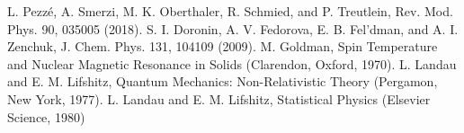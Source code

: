 \begin{thebibliography}{}

 L. Pezz\'e, A. Smerzi, M. K. Oberthaler, R. Schmied, and P. Treutlein, Rev. Mod. Phys. 90, 035005 (2018).
 S. I. Doronin, A. V. Fedorova, E. B. Fel’dman, and A. I. Zenchuk, J. Chem. Phys. 131, 104109 (2009).
 M. Goldman, Spin Temperature and Nuclear Magnetic Resonance in Solids (Clarendon, Oxford, 1970).
 L. Landau and E. M. Lifshitz, Quantum Mechanics: Non-Relativistic Theory (Pergamon, New York, 1977).
 L. Landau and E. M. Lifshitz, Statistical Physics (Elsevier Science, 1980)



\end{thebibliography}
